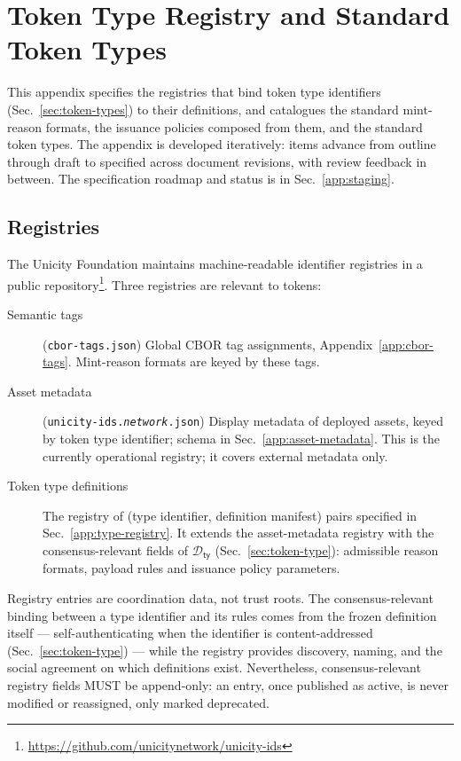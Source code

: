 \chapter{Token Type Registry and Standard Token Types}\label{app:token-registry}

This appendix specifies the registries that bind token type identifiers (Sec.~\ref{sec:token-types}) to their definitions, and catalogues the standard mint-reason formats, the issuance policies composed from them, and the standard token types. The appendix is developed iteratively: items advance from outline through draft to specified across document revisions, with review feedback in between. The specification roadmap and status is in Sec.~\ref{app:staging}.

\section{Registries}\label{app:registries}

The Unicity Foundation maintains machine-readable identifier registries in a public repository\footnote{\url{https://github.com/unicitynetwork/unicity-ids}}. Three registries are relevant to tokens:

\begin{description}
\item[Semantic tags] (\texttt{cbor-tags.json}) Global CBOR tag assignments, Appendix~\ref{app:cbor-tags}. Mint-reason formats are keyed by these tags.
\item[Asset metadata] (\texttt{unicity-ids.\textit{network}.json}) Display metadata of deployed assets, keyed by token type identifier; schema in Sec.~\ref{app:asset-metadata}. This is the currently operational registry; it covers external metadata only.
\item[Token type definitions] The registry of (type identifier, definition manifest) pairs specified in Sec.~\ref{app:type-registry}. It extends the asset-metadata registry with the consensus-relevant fields of $\mathcal{D}_\mathsf{ty}$ (Sec.~\ref{sec:token-type}): admissible reason formats, payload rules and issuance policy parameters.
\end{description}

Registry entries are coordination data, not trust roots. The consensus-relevant binding between a type identifier and its rules comes from the frozen definition itself --- self-authenticating when the identifier is content-addressed (Sec.~\ref{sec:token-type}) --- while the registry provides discovery, naming, and the social agreement on which definitions exist. Nevertheless, consensus-relevant registry fields MUST be append-only: an entry, once published as active, is never modified or reassigned, only marked deprecated.

